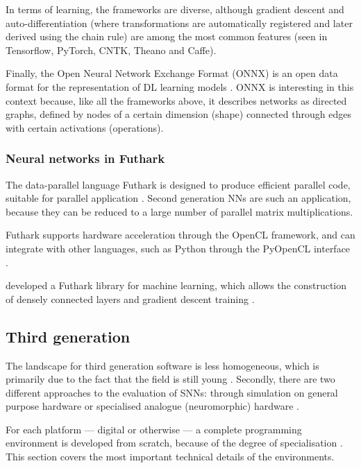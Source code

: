 \documentclass[report.tex]{subfiles}
\begin{document}
In terms of learning, the frameworks are diverse, although gradient descent 
and auto-differentiation (where transformations are automatically registered and 
later derived using the chain rule) are among the most common features 
(seen in Tensorflow, PyTorch, CNTK, Theano and Caffe). 

Finally, the Open Neural Network Exchange Format (ONNX) is an open data format for the representation
of \gls{DL} learning models \cite{ONNX2018}. 
ONNX is interesting in this context because, like all the frameworks above, it describes 
networks as directed graphs, defined by nodes of a certain dimension (shape) connected through
edges with certain activations (operations).

\subsubsection{Neural networks in Futhark}
The data-parallel language Futhark is designed to produce efficient parallel
code, suitable for parallel application \cite{Henriksen2017}.
Second generation \glspl{NN} are such an application, because they can be reduced
to a large number of parallel matrix multiplications.

Futhark supports hardware acceleration through the \gls{OpenCL} framework,
and can integrate with other languages, such as \gls{Python} through the
PyOpenCL interface \cite{PyOpenCL}.

\citeauthor{Minh2018} developed a Futhark library for machine learning, which 
allows the construction of densely connected layers and gradient descent
training \cite{Minh2018}.

\subsection{Third generation}
The landscape for third generation software is less homogeneous, which is primarily due to the fact that the field is still young \cite{Maass1997}.
Secondly, there are two different approaches to the evaluation of \glspl{SNN}:
through simulation on general purpose hardware or specialised analogue
(neuromorphic) hardware \cite{Maass1997, Davison2009, Albada2018}.

For each platform --- digital or otherwise --- a complete programming environment
is developed from scratch, because of the degree of specialisation
\cite{Walter2015, Lin2018}.
This section covers the most important technical details of
the environments.
\end{document}
